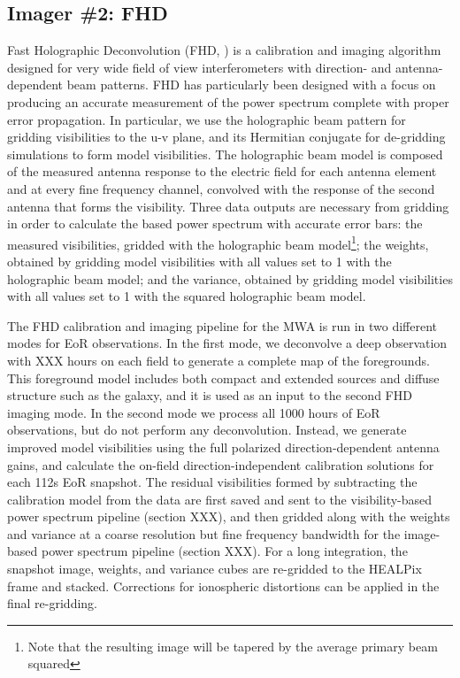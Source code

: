 \subsection{Imager \#2: FHD}
Fast Holographic Deconvolution (FHD, \citet{an_Bunton_Cappallo_et_al__2012}) is a calibration and imaging algorithm designed for very wide field of view interferometers with direction- and antenna-dependent beam patterns. FHD has particularly been designed with a focus on producing an accurate measurement of the power spectrum complete with proper error propagation. In particular, we use the holographic beam pattern for gridding visibilities to the u-v plane, and its Hermitian conjugate for de-gridding simulations to form model visibilities. The holographic beam model is composed of the measured antenna response to the electric field for each antenna element and at every fine frequency channel, convolved with the response of the second antenna that forms the visibility. Three data outputs are necessary from gridding in order to calculate the based power spectrum with accurate error bars: the measured visibilities, gridded with the holographic beam model\footnote{Note that the resulting image will be tapered by the average primary beam squared}; the weights, obtained by gridding model visibilities with all values set to 1 with the holographic beam model; and the variance, obtained by gridding model visibilities with all values set to 1 with the squared holographic beam model.

The FHD calibration and imaging pipeline for the MWA is run in two different modes for EoR observations. In the first mode, we deconvolve a deep observation with XXX hours on each field to generate a complete map of the foregrounds. This foreground model includes both compact and extended sources and diffuse structure such as the galaxy, and it is used as an input to the second FHD imaging mode. In the second mode we process all 1000 hours of EoR observations, but do not perform any deconvolution. Instead, we generate improved model visibilities using the full polarized direction-dependent antenna gains, and calculate the on-field direction-independent calibration solutions for each 112s EoR snapshot. The residual visibilities formed by subtracting the calibration model from the data are first saved and sent to the visibility-based power spectrum pipeline (section XXX), and then gridded along with the weights and variance at a coarse resolution but fine frequency bandwidth for the image-based power spectrum pipeline (section XXX). For a long integration, the snapshot image, weights, and variance cubes are re-gridded to the HEALPix frame and stacked. Corrections for ionospheric distortions can be applied in the final re-gridding.
